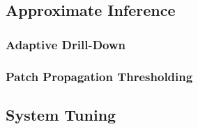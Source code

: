 \subsection{Approximate Inference}

\subsubsection{Adaptive Drill-Down}

\subsubsection{Patch Propagation Thresholding}

\subsection{System Tuning}
